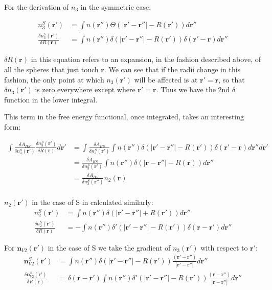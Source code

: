 {  For the derivation of $n_{3}$ in the symmetric case:

\begin{align}  
  n_3^{S}(\mathbf{r}') &= \int n(\mathbf{r}'') \Theta(\left|\mathbf{r}' - \mathbf{r}''\right| -R(\mathbf{r}')) d\mathbf{r}''\\
  \frac{\delta n_3^{S} (\mathbf{r}')}{\delta R(\mathbf{r})} &=
  \int n (\mathbf{r}'') \delta(|\mathbf{r}' - \mathbf{r}''| - R(\mathbf{r}')) \delta(\mathbf{r}'-\mathbf{r}) d\mathbf{r}''
\end{align}
  
  $\delta R(\mathbf{r})$ in this equation refers to an expansion, in the fashion described above, of all the spheres that just touch $\mathbf{r}$.  We can see that if the radii change in this fashion, the only point at which $n_3(\mathbf{r}')$ will be affected is at $\mathbf{r}' = \mathbf{r}$, so that $\delta n_3(\mathbf{r}')$ is zero everywhere except where $\mathbf{r}' = \mathbf{r}$.  Thus we have the 2nd $\delta$ function in the lower integral.

This term in the free energy functional, once integrated, takes an interesting form:  

\begin{align}
  \int \frac{\delta A_{HS}}{\delta n_3^{S}(\mathbf{r}')} 
  \frac{\delta n_3^{S}(\mathbf{r}')}{\delta R(\mathbf{r})} d\mathbf{r}' 
  &= \int \frac{\delta A_{HS}}{\delta n_3^{S}(\mathbf{r}')} \int n (\mathbf{r}'') \delta(|\mathbf{r}' - \mathbf{r}''| - R(\mathbf{r}')) \delta(\mathbf{r}'-\mathbf{r}) d\mathbf{r}'' d\mathbf{r}' \\
  &= \frac{\delta A_{HS}}{\delta n_3^{S}(\mathbf{r}')} \int n (\mathbf{r}'') \delta(|\mathbf{r} - \mathbf{r}''| - R(\mathbf{r})) d\mathbf{r}''\\
  &= \frac{\delta A_{HS}}{\delta n_3^{S}(\mathbf{r}'')} n_2(\mathbf{r})\\
\end{align}
  
 $n_2(\mathbf{r}')$ in the case of S in calculated similarly:
\begin{align}
  n_2^{S}(\mathbf{r}') &= \int n(\mathbf{r}'') \delta(|\mathbf{r}' - \mathbf{r}''| + R(\mathbf{r}'))d\mathbf r''\\
    \frac{\delta n_2^{S}(\mathbf{r}')}{\delta R(\mathbf{r})} &= -\int n(\mathbf{r}'') 
  \delta'(|\mathbf{r}'-\mathbf{r}''| - R(\mathbf{r}')) \delta(\mathbf{r}-\mathbf{r}') d\mathbf{r}''
\end{align}

For $\mathbf{n}_{V2}(\mathbf{r}')$ in the case of S we take the gradient of $n_3(\mathbf{r}')$ with respect to $\mathbf{r}'$: 
\begin{align}
  \mathbf{n}_{V2}^{S}(\mathbf{r}') &= \int n(\mathbf{r}'') \delta(|\mathbf{r}' - \mathbf{r}''| - R(\mathbf{r}'))
  \frac{(\mathbf{r}' - \mathbf{r}'')}{|\mathbf{r}' - \mathbf{r}''|} d \mathbf{r}''\\
  \frac{\delta \mathbf{n}_{V2}^{S}(\mathbf{r}')}{\delta R(\mathbf{r})} &= \delta(\mathbf{r} - \mathbf{r}')
  \int n(\mathbf{r}'') \delta'(|\mathbf{r}' - \mathbf{r}''| - R(\mathbf{r}')) 
  \frac{(\mathbf{r} - \mathbf{r}'')}{|\mathbf{r} - \mathbf{r}''|} d\mathbf{r}''
\end{align}

}

